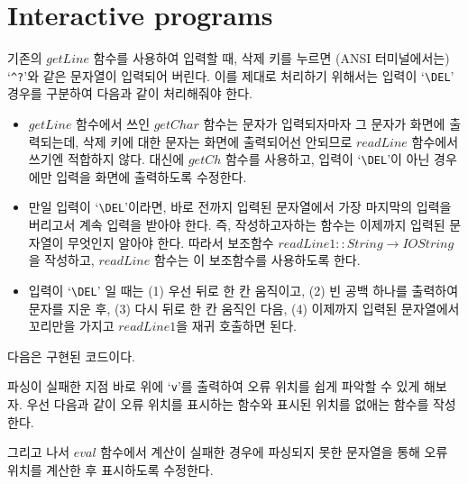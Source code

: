 \chapter{\Large{Interactive programs}}


기존의 $getLine$ 함수를 사용하여 입력할 때, 삭제 키를 누르면 (ANSI
터미널에서는) `\texttt{\^{}?}'와 같은 문자열이 입력되어 버린다. 이를 제대로
처리하기 위해서는 입력이 `\texttt{\textbackslash DEL}' 경우를 구분하여 다음과
같이 처리해줘야 한다.

\begin{itemize}
\item $getLine$ 함수에서 쓰인 $getChar$ 함수는 문자가 입력되자마자 그 문자가
  화면에 출력되는데, 삭제 키에 대한 문자는 화면에 출력되어선 안되므로
  $readLine$ 함수에서 쓰기엔 적합하지 않다. 대신에
  $getCh$ 함수를 사용하고, 입력이 `\texttt{\textbackslash DEL}'이 아닌
  경우에만 입력을 화면에 출력하도록 수정한다.
\item 만일 입력이 `\texttt{\textbackslash DEL}'이라면, 바로 전까지 입력된
  문자열에서 가장 마지막의 입력을 버리고서 계속 입력을 받아야 한다. 즉,
  작성하고자하는 함수는 이제까지 입력된 문자열이 무엇인지 알아야 한다. 따라서
  보조함수 $readLine1 :: String \rightarrow IO String$을 작성하고, $readLine$
  함수는 이 보조함수를 사용하도록 한다.
\item 입력이 `\texttt{\textbackslash DEL}' 일 때는 (1) 우선 뒤로 한 칸 움직이고,
  (2) 빈 공백 하나를 출력하여 문자를 지운 후, (3) 다시 뒤로 한 칸 움직인 다음,
  (4) 이제까지 입력된 문자열에서 꼬리만을 가지고 $readLine1$을 재귀 호출하면 된다.
\end{itemize}

다음은 구현된 코드이다.



파싱이 실패한 지점 바로 위에 `\texttt{v}'를 출력하여 오류 위치를 쉽게 파악할
수 있게 해보자. 우선 다음과 같이 오류 위치를 표시하는 함수와 표시된 위치를
없애는 함수를 작성한다.


그리고 나서 $eval$ 함수에서 계산이 실패한 경우에 파싱되지 못한 문자열을 통해
오류 위치를 계산한 후 표시하도록 수정한다.


